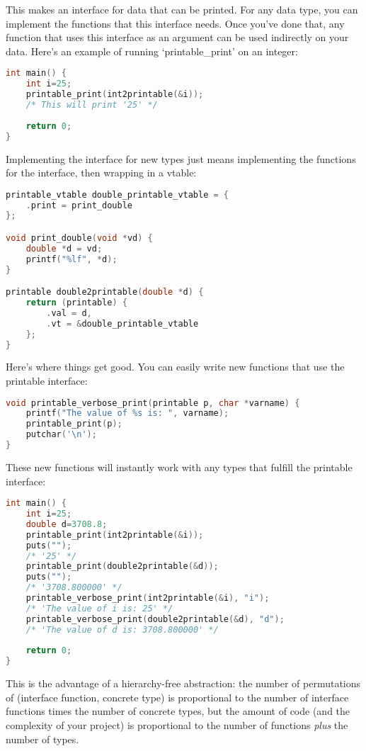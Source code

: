 \documentclass[12pt]{article}
\begin{document}
This makes an interface for data that can be printed. For any data type,
you can implement the functions that this interface needs. Once you've done that,
any function that uses this interface as an argument can be used indirectly on
your data. Here's an example of running `printable\_print' on an integer:

\begin{lstlisting}[language=C]
int main() {
    int i=25;
    printable_print(int2printable(&i));
    /* This will print '25' */
    
    return 0;
}
\end{lstlisting}

Implementing the interface for new types just means implementing the functions for the interface, then wrapping in a vtable:

\begin{lstlisting}[language=C]
printable_vtable double_printable_vtable = {
    .print = print_double
};

void print_double(void *vd) {
    double *d = vd;
    printf("%lf", *d);
}

printable double2printable(double *d) {
    return (printable) {
        .val = d,
        .vt = &double_printable_vtable
    };
}
\end{lstlisting}

Here's where things get good. You can easily write new functions that use the printable interface:

\begin{lstlisting}[language=C]
void printable_verbose_print(printable p, char *varname) {
    printf("The value of %s is: ", varname);
    printable_print(p);
    putchar('\n');
}
\end{lstlisting}

These new functions will instantly work with
any types that fulfill the printable interface:

\begin{lstlisting}[language=C]
int main() {
    int i=25;
    double d=3708.8;
    printable_print(int2printable(&i));
    puts("");
    /* '25' */
    printable_print(double2printable(&d));
    puts("");
    /* '3708.800000' */
    printable_verbose_print(int2printable(&i), "i");
    /* 'The value of i is: 25' */
    printable_verbose_print(double2printable(&d), "d");
    /* 'The value of d is: 3708.800000' */
    
    return 0;
}
\end{lstlisting}

This is the advantage of a hierarchy-free abstraction: the number of
permutations of (interface function, concrete type) is proportional to 
the number of interface functions times the number of concrete types,
but the amount of code (and the complexity of your project) is proportional
to the number of functions \textit{plus} the number of types.
\end{document}
